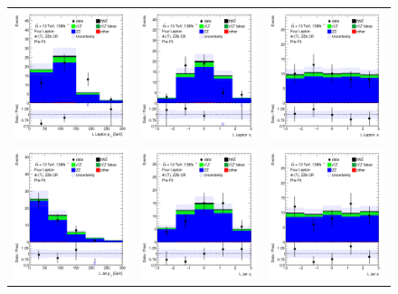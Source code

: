 \begin{figure}[htbp]
\begin{tabular}{ccc}
    \includegraphics[width=.25\textwidth]{figures/PreFitPlots/lep4_ZZb_4T_L_lepton_pt.png} &
    \includegraphics[width=.25\textwidth]{figures/PreFitPlots/lep4_ZZb_4T_L_lepton_eta.png} &
    \includegraphics[width=.25\textwidth]{figures/PreFitPlots/lep4_ZZb_4T_L_lepton_phi.png} \\
    \includegraphics[width=.25\textwidth]{figures/PreFitPlots/lep4_ZZb_4T_LJet_pt.png} &
    \includegraphics[width=.25\textwidth]{figures/PreFitPlots/lep4_ZZb_4T_LJet_eta.png} &
    \includegraphics[width=.25\textwidth]{figures/PreFitPlots/lep4_ZZb_4T_LJet_phi.png} \\


\end{tabular}
\end{figure}
